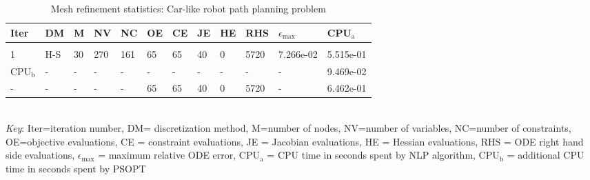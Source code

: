 
\begin{table}
\caption{Mesh refinement statistics: Car-like robot path planning problem}
\label{mesh_stats_path_planning}
\renewcommand{\tabcolsep}{0.15cm}
\tiny
\begin{tabular}{llllllllllll}
Iter&DM&M&NV&NC&OE&CE&JE&HE&RHS&$\epsilon_{\max}$&CPU$_\mathrm{a}$ \\ \hline \\
1&H-S&30&270&161&65&65&40&0&5720&7.266e-02&5.515e-01\\
\hline
CPU$_\mathrm{b}$ &-&-&-&-&-&-&-&-&-&-&9.469e-02\\
-&-&-&-&-&65&65&40&0&5720&-&6.462e-01\\
\end{tabular}
\newline \\ \emph{Key}: Iter=iteration number, DM= discretization method, M=number of nodes, NV=number of variables, NC=number of constraints, OE=objective evaluations,  	              CE = constraint evaluations, JE = Jacobian evaluations, HE = Hessian evaluations, RHS = ODE right hand side 		      evaluations, $\epsilon_{\max}$ = maximum relative ODE error, CPU$_\mathrm{a}$ = CPU time in seconds spent by NLP algorithm, 		      CPU$_\mathrm{b}$ = additional CPU time in seconds spent by PSOPT
\normalsize
\end{table}